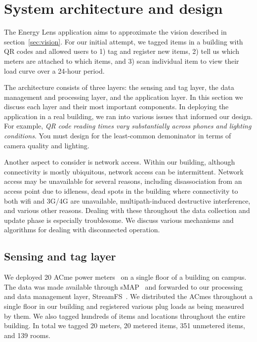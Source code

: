 \section{System architecture and design}
The Energy Lens application aims to approximate the vision described in section~\ref{sec:vision}.  For our initial
attempt, we tagged items in a building with QR codes and allowed users to 1) tag and register new items, 
2) tell us which meters are attached to which items, and 3) scan individual item to view their load curve over a 
24-hour period.

The architecture consists of three layers: the sensing and tag layer, the data management and processing layer, and the application
layer.  In this section we discuss each layer and their most important components.  In deploying the application in a real building, 
we ran into various issues that informed our design.  For example, \emph{QR code reading times vary substantially across phones
and lighting conditions}.  You must design for the least-common demoninator in terms of camera quality and lighting.

Another aspect to consider is network access.  Within our building, although connectivity is mostly ubiquitous, network
access can be intermittent.  Network access may be unavailable for several reasons, including disassociation from an access point due
to idleness, dead spots in the building where connectivity to both wifi and 3G/4G are unavailable, multipath-induced
destructive interference, and various other reasons.  Dealing with these throughout the data collection and update phase is
especially troublesome.  We discuss various mechanisms and algorithms for dealing with disconnected operation.





\subsection{Sensing and tag layer}
We deployed 20 ACme power meters~\cite{acme} on a single floor of a building on campus.  The data was made available through
sMAP~\cite{smap} and forwarded to our processing and data management layer, StreamFS~\cite{streamfs}.  We distributed
the ACmes throughout a single floor in our building and registered various plug loads as being measured by them.  We also tagged
hundreds of items and locations throughout the entire building.  In total we tagged 20 meters, 20 metered items, 351 unmetered items,
 and 139 rooms.






